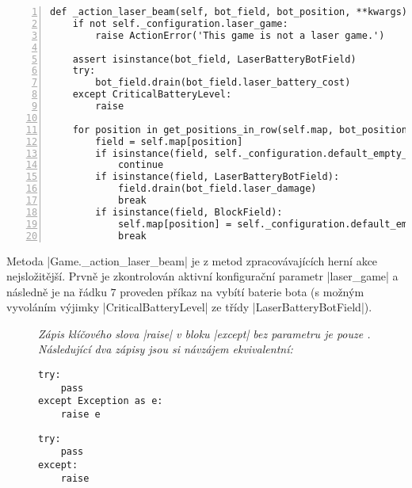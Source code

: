 \begin{lstlisting}[caption={Metoda $Game.\_action\_laser\_beam$},label={lst:game-action-laser-beam},numbers=left]
def _action_laser_beam(self, bot_field, bot_position, **kwargs):
    if not self._configuration.laser_game:
        raise ActionError('This game is not a laser game.')

    assert isinstance(bot_field, LaserBatteryBotField)
    try:
        bot_field.drain(bot_field.laser_battery_cost)
    except CriticalBatteryLevel:
        raise

    for position in get_positions_in_row(self.map, bot_position, bot_field.orientation):
        field = self.map[position]
        if isinstance(field, self._configuration.default_empty_map_field):
            continue
        if isinstance(field, LaserBatteryBotField):
            field.drain(bot_field.laser_damage)
            break
        if isinstance(field, BlockField):
            self.map[position] = self._configuration.default_empty_map_field()
            break
\end{lstlisting}

Metoda \ic|Game._action_laser_beam| je z metod zpracovávajících herní akce nejsložitější. Prvně je zkontrolován aktivní konfigurační parametr \ic|laser_game| a následně je na řádku $7$ proveden příkaz na vybítí baterie bota (s možným vyvoláním výjimky \ic|CriticalBatteryLevel| ze třídy \ic|LaserBatteryBotField|).

\begin{figure}
    {\itshape
    Zápis klíčového slova \ic|raise| v bloku \ic|except| bez parametru je pouze \footnotemark. Následující dva zápisy jsou si návzájem ekvivalentní:
    }
    \begin{minipage}{.475\textwidth}
    \vspace{10pt}
    \begin{lstlisting}
try:
    pass
except Exception as e:
    raise e
    \end{lstlisting}
    \end{minipage}
    \hfill
    \begin{minipage}{.475\textwidth}
    \vspace{10pt}
    \begin{lstlisting}
try:
    pass
except:
    raise
    \end{lstlisting}
    \end{minipage}
\end{figure}

